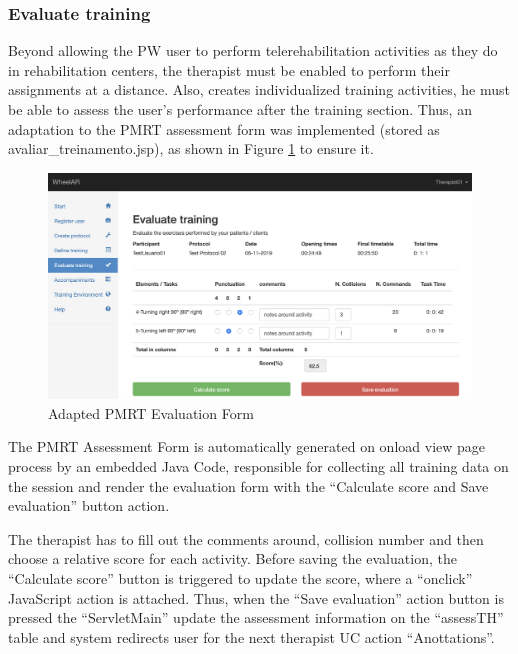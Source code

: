\subsubsection{Evaluate training}

Beyond allowing the PW user to perform telerehabilitation activities as they do in rehabilitation centers, the therapist must be enabled to perform their assignments at a distance. Also, creates individualized training activities, he must be able to assess the user's performance after the training section. Thus, an adaptation to the PMRT assessment form was implemented (stored as avaliar\_treinamento.jsp), as shown in Figure \ref{fig:tEvaluateTraining} to ensure it.

\begin{figure}[!hbt]
\begin{center}
\includegraphics[width=1\linewidth]{img/cap5/tEvaluateTraining}
\caption{Adapted PMRT Evaluation Form} \label{fig:tEvaluateTraining}
\end{center}
\end{figure}

The PMRT Assessment Form is automatically generated on onload view page process by an embedded Java Code, responsible for collecting all training data on the session and render the evaluation form with the ``Calculate score and Save evaluation'' button action. 

The therapist has to fill out the comments around, collision number and then choose a relative score for each activity. Before saving the evaluation, the ``Calculate score'' button is triggered to update the score, where a ``onclick'' JavaScript action is attached. Thus, when the ``Save evaluation'' action button is pressed  the ``ServletMain'' update the assessment information on the ``assessTH'' table and system redirects user for the next therapist UC action ``Anottations''. 

